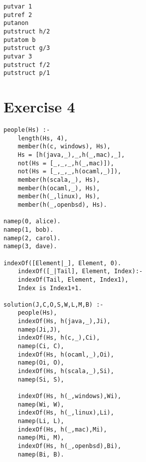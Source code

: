 \documentclass[10pt,a4paper]{article}
\begin{document}
\begin{lstlisting}
putvar 1
putref 2
putanon
putstruct h/2
putatom b
putstruct g/3
putvar 3
putstruct f/2
putstruct p/1
\end{lstlisting}

\section{Exercise 4}

\begin{lstlisting}
people(Hs) :-
	length(Hs, 4),
	member(h(c, windows), Hs),
	Hs = [h(java,_),_,h(_,mac),_],
	not(Hs = [_,_,_,h(_,mac)]),
	not(Hs = [_,_,_,h(ocaml,_)]),
	member(h(scala,_), Hs),
	member(h(ocaml,_), Hs),
	member(h(_,linux), Hs),
	member(h(_,openbsd), Hs).

namep(0, alice).
namep(1, bob).
namep(2, carol).
namep(3, dave).

indexOf([Element|_], Element, 0).
	indexOf([_|Tail], Element, Index):-
	indexOf(Tail, Element, Index1),
	Index is Index1+1.

solution(J,C,O,S,W,L,M,B) :-
	people(Hs),
	indexOf(Hs, h(java,_),Ji),
	namep(Ji,J),
	indexOf(Hs, h(c,_),Ci),
	namep(Ci, C),
	indexOf(Hs, h(ocaml,_),Oi),
	namep(Oi, O),
	indexOf(Hs, h(scala,_),Si),
	namep(Si, S),
	
	indexOf(Hs, h(_,windows),Wi),
	namep(Wi, W),
	indexOf(Hs, h(_,linux),Li),
	namep(Li, L),
	indexOf(Hs, h(_,mac),Mi),
	namep(Mi, M),
	indexOf(Hs, h(_,openbsd),Bi),
	namep(Bi, B).
\end{lstlisting}
\end{document}
